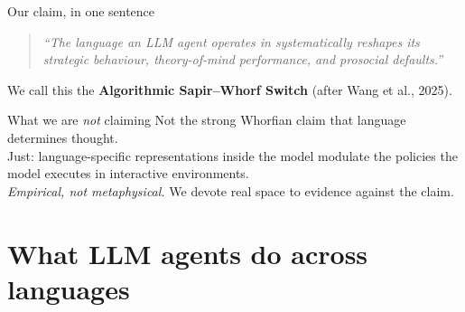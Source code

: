 \documentclass[11pt,aspectratio=169]{beamer}
\begin{document}
\begin{frame}{Our claim, in one sentence}
    \vspace{0.2cm}
    \large
    \begin{quote}
        \itshape ``The language an LLM agent operates in systematically reshapes its strategic behaviour, theory-of-mind performance, and prosocial defaults.''
    \end{quote}
    \vspace{0.3cm}
    \normalsize
    We call this the \textbf{Algorithmic Sapir--Whorf Switch} (after Wang et al., 2025).
    \vspace{0.4cm}
    \begin{block}{What we are \emph{not} claiming}
        Not the strong Whorfian claim that language determines thought.\\
        Just: language-specific representations inside the model modulate the policies the model executes in interactive environments.\\
        \emph{Empirical, not metaphysical.} We devote real space to evidence against the claim.
    \end{block}
\end{frame}

\section{What LLM agents do across languages}
\end{document}
